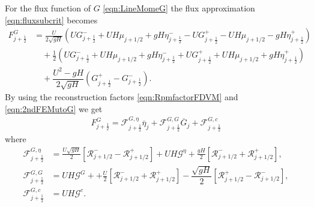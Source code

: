 For the flux function of $G$ \eqref{eqn:LineMomeG} the flux approximation \eqref{eqn:fluxsubcrit} becomes
\begin{align*}
F^G_{j+\frac{1}{2}} &= \frac{U}{2 \sqrt{gH}} \left(UG^-_{j+\frac{1}{2}} + UH \mu_{j+1/2} + gH\eta^-_{j+\frac{1}{2}} - UG^+_{j+\frac{1}{2}} - UH \mu_{j+1/2} - gH\eta^+_{j+\frac{1}{2}}  \right)   \nonumber \\ & \quad + \frac{1}{2}\left(UG^-_{j+\frac{1}{2}} + UH \mu_{j+1/2} + gH\eta^-_{j+\frac{1}{2}} + UG^+_{j+\frac{1}{2}} + UH \mu_{j+1/2} + gH\eta^+_{j+\frac{1}{2}}\right) \nonumber \\ & \quad+ \dfrac{U^2 - gH}{2\sqrt{g H}} \left ( G^+_{j+\frac{1}{2}} - G^-_{j+\frac{1}{2}} \right ).
\end{align*}
By using the reconstruction factors \eqref{eqn:RpmfactorFDVM} and \eqref{eqn:2ndFEMutoG} we get
	\begin{align*}
	F^G_{j+\frac{1}{2}} = \mathcal{F}^{G, \eta}_{j+\frac{1}{2}} \overline{\eta}_{j} + \mathcal{F}^{G, G}_{j+\frac{1}{2}} \overline{G}_{j} + \mathcal{F}^{G, c}_{j+\frac{1}{2}}
	\end{align*}
	where
	\begin{align*}
		\mathcal{F}^{G, \eta}_{j+\frac{1}{2}} &=  \frac{U\sqrt{gH}}{2} \left[ \mathcal{R}^-_{j+1/2} - \mathcal{R}^+_{j+1/2}  \right] + UH\mathcal{G}^{\eta} + \frac{gH}{2} \left[ \mathcal{R}^-_{j+1/2} +\mathcal{R}^+_{j+1/2} \right], \\
	\mathcal{F}^{G, G}_{j+\frac{1}{2}} &=  UH\mathcal{G}^{G} + + \frac{U}{2} \left[ \mathcal{R}^-_{j+1/2} +\mathcal{R}^+_{j+1/2} \right] - \dfrac{\sqrt{g H}}{2} \left [\mathcal{R}^+_{j+1/2} - \mathcal{R}^-_{j+1/2} \right ],  \\
	\mathcal{F}^{G, c}_{j+\frac{1}{2}} &=  UH\mathcal{G}^c.
	\end{align*}



